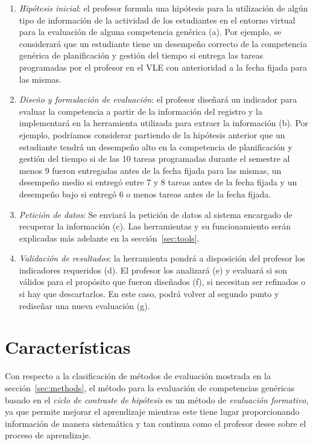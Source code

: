 \begin{enumerate}
\item \emph{Hipótesis inicial}: el profesor formula una hipótesis para la utilización de algún tipo de información de la actividad de los estudiantes en el entorno virtual para la evaluación de alguna competencia genérica (a). Por ejemplo, se considerará que un estudiante tiene un desempeño correcto de la competencia genérica de planificación y gestión del tiempo si entrega las tareas programadas por el profesor en el VLE con anterioridad a la fecha fijada para las mismas.
\item \emph{Diseño y formulación de evaluación}: el profesor diseñará un indicador para evaluar la competencia a partir de la información del registro y la implementará en la herramienta utilizada para extraer la información (b). Por ejemplo, podríamos considerar partiendo de la hipótesis anterior que un estudiante tendrá un desempeño alto en la competencia de planificación y gestión del tiempo si de las 10 tareas programadas durante el semestre al menos 9 fueron entregadas antes de la fecha fijada para las mismas, un desempeño medio si entregó entre 7 y 8 tareas antes de la fecha fijada y un desempeño bajo si entregó 6 o menos tareas antes de la fecha fijada.
\item \emph{Petición de datos}: Se enviará la petición de datos al sistema encargado de recuperar la información (c). Las herramientas y su funcionamiento serán explicadas más adelante en la sección~\ref{sec:tools}.
\item \emph{Validación de resultados}: la herramienta pondrá a disposición del profesor los indicadores requeridos (d). El profesor los analizará (e) y evaluará si son válidos para el propósito que fueron diseñados (f), si necesitan ser refinados o si hay que descartarlos. En este caso, podrá volver al segundo punto y rediseñar una nueva evaluación (g).
\end{enumerate}

\section{Características}

Con respecto a la clasificación de métodos de evaluación mostrada en la sección~\ref{sec:methods}, el método para la evaluación de competencias genéricas basado en el \emph{ciclo de contraste de hipótesis} es un método de \emph{evaluación formativo}, ya que permite mejorar el aprendizaje mientras este tiene lugar proporcionando información de manera sistemática y tan continua como el profesor desee sobre el proceso de aprendizaje.

